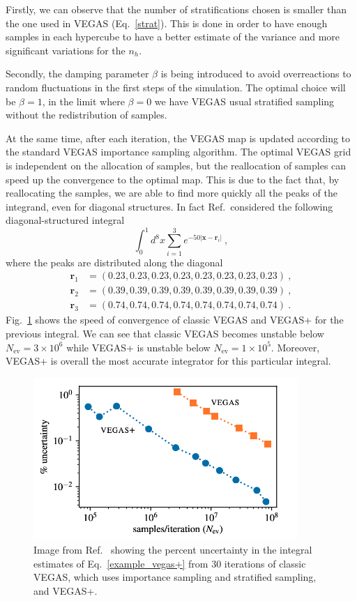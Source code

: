 \documentclass[../main/main.tex]{subfiles}
\begin{document}
Firstly, we can observe that the number of stratifications chosen is smaller than the one used in VEGAS (Eq.~\ref{strat}). This is done in order to
have enough samples in each hypercube to have a better estimate of the variance and more significant variations for the $n_h$. 

Secondly, the damping parameter $\beta$ is being introduced to avoid overreactions to random fluctuations in the first steps of the simulation. The optimal choice will be $\beta=1$, in the limit where $\beta=0$ we have VEGAS usual stratified sampling without the redistribution of samples.

At the same time, after each iteration, the VEGAS map is updated according to the standard VEGAS importance sampling algorithm. The optimal VEGAS grid is independent on the allocation of samples, but the reallocation of samples can speed up the convergence to the optimal map. This is due to the fact that, by reallocating the samples, we are able to find more quickly all the peaks of the integrand, even for diagonal structures.
In fact Ref.~\cite{Lepage:2020tgj}considered the following diagonal-structured integral
\begin{equation}
	\label{example_vegas+}
	\int_0^1 d^8 x \sum_{i=1}^3 e^{-50 |\textbf{x}- \textbf{r}_i|} \ ,
\end{equation}
where the peaks are distributed along the diagonal
\begin{eqnarray*}
	\textbf{r}_1 &= (0.23,0.23,0.23,0.23,0.23,0.23,0.23,0.23)  \ ,\\
	\textbf{r}_2 &= (0.39,0.39,0.39,0.39,0.39,0.39,0.39,0.39)  \ , \\
	\textbf{r}_3 &=(0.74,0.74,0.74,0.74,0.74,0.74,0.74,0.74)   \ .
\end{eqnarray*}
Fig.~\ref{vegas_vegas+} shows the speed of convergence of classic VEGAS and VEGAS+ for the previous integral. We can see that classic VEGAS becomes unstable below $N_\text{ev} =3 \times 10^6$ while VEGAS+ is unstable below $N_\text{ev} =1 \times 10^5$. Moreover,
VEGAS+ is overall the most accurate integrator for this particular integral.

\begin{figure}[h]
	\centering
	\includegraphics[width=10cm]{../images/VEGAS-VEGAS+.png}
	\caption{Image from Ref.~\cite{Lepage:2020tgj} showing the percent uncertainty in the integral estimates of Eq.~\ref{example_vegas+} from 30 iterations of classic VEGAS, which uses importance sampling and stratified sampling,  and VEGAS+.}
	\label{vegas_vegas+}
\end{figure}
\end{document}

